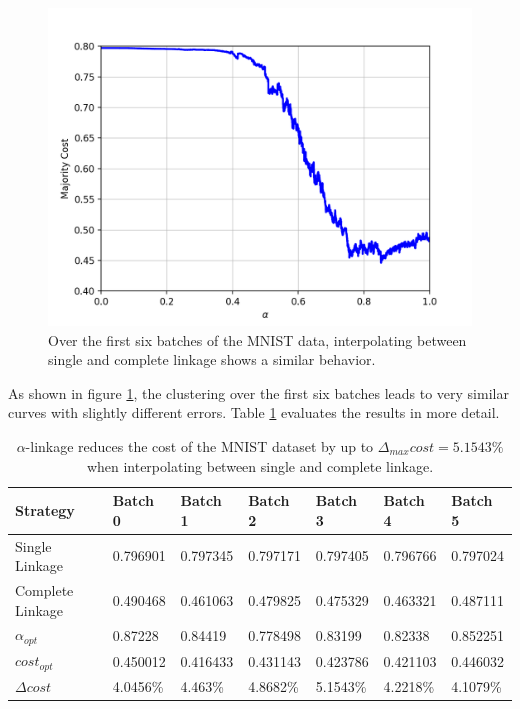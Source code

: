 \begin{figure}[h]
\begin{minipage}{.3\textwidth}
\end{minipage}
\begin{minipage}{.3\textwidth}
  \centering
  \includegraphics[width=\linewidth]{plots/mnist-sc-5}
\end{minipage}
\caption{Over the first six batches of the MNIST data, interpolating between single and complete linkage shows a similar behavior.}
\label{fig:mnistscbatches}
\end{figure}

As shown in figure \ref{fig:mnistscbatches}, the clustering over the first six batches leads to very similar curves with slightly different errors. Table \ref{table:mnistscbatches} evaluates the results in more detail.

\begin{table}[H]
    \centering
    \begin{tabular}{|l | l l l l l l |}
    \hline
    Strategy & Batch 0 & Batch 1 & Batch 2 & Batch 3 & Batch 4 & Batch 5\\ \hline
    Single Linkage & 0.796901 & 0.797345 & 0.797171 & 0.797405 & 0.796766 & 0.797024\\
    Complete Linkage & 0.490468 & 0.461063 & 0.479825 & 0.475329 & 0.463321 & 0.487111\\
    $\alpha_{opt}$ & 0.87228 & 0.84419 & 0.778498 & 0.83199 & 0.82338 & 0.852251\\
    $cost_{opt}$ & 0.450012 & 0.416433 & 0.431143 & 0.423786 & 0.421103 & 0.446032\\
    $\Delta cost$ & 4.0456\% & 4.463\% & 4.8682\% & 5.1543\% & 4.2218\% & 4.1079\%\\\hline
    \end{tabular}
    \caption{$\alpha$-linkage reduces the cost of the MNIST dataset by up to $\Delta_{max} cost = 5.1543\%$ when interpolating between single and complete linkage.}
    \label{table:mnistscbatches}
\end{table}

